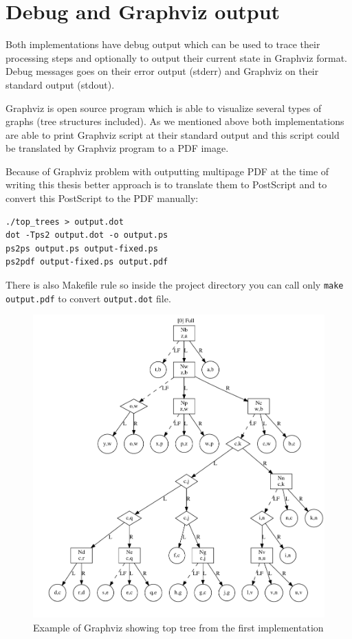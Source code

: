 \goodbreak

\section{Debug and Graphviz output}

Both implementations have debug output which can be used to trace their
processing steps and optionally to output their current state in Graphviz
format. Debug messages goes on their error output (stderr) and Graphviz on
their standard output (stdout).

Graphviz is open source program which is able to visualize several types of
graphs (tree structures included).  As we mentioned above both implementations
are able to print Graphviz script at their standard output and this script could
be translated by Graphviz program to a PDF image.

Because of Graphviz problem with outputting multipage PDF at the time of writing
this thesis better approach is to translate them to PostScript and to convert
this PostScript to the PDF manually:

\begin{verbatim}
./top_trees > output.dot
dot -Tps2 output.dot -o output.ps
ps2ps output.ps output-fixed.ps
ps2pdf output-fixed.ps output.pdf
\end{verbatim}

There is also Makefile rule so inside the project directory you can call only
\texttt{make output.pdf} to convert \texttt{output.dot} file.

\begin{figure}[h]
\centering
\includegraphics[width=0.8\hsize]{pic/chap04_graphviz_example.pdf}
\caption{Example of Graphviz showing top tree from the first implementation}
\end{figure}

